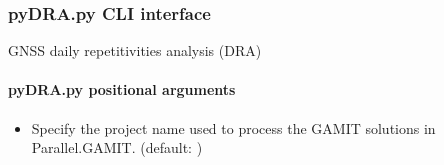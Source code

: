 \documentclass[letterpaper,10pt,english]{sphinxmanual}
\begin{document}
\subsubsection{pyDRA.py \sphinxhyphen{} CLI interface}
\label{\detokenize{stacker:pyDRA.py---CLI-interface}}
\sphinxAtStartPar
GNSS daily repetitivities analysis (DRA)

\begin{sphinxVerbatim}[commandchars=\\\{\}]
 \PYG{p}{[}\PYG{p}{]} \PYG{p}{[}  \PYG{p}{[} \PYG{p}{]}\PYG{p}{]} \PYG{p}{[}  \PYG{p}{[} \PYG{p}{]}\PYG{p}{]} \PYG{p}{[}\PYG{p}{]} \PYG{p}{[}\PYG{p}{]} \PYG{p}{[}\PYG{p}{]}  
\end{sphinxVerbatim}


\paragraph{pyDRA.py positional arguments}
\label{\detokenize{stacker:pyDRA.py-positional-arguments}}\begin{itemize}
\item {} 
\sphinxAtStartPar
{\hyperref[\detokenize{stacker:pyDRA.py-_project-name_}]{}} \sphinxhyphen{} Specify the project name used to process the GAMIT solutions in Parallel.GAMIT. (default: )

\end{itemize}
\end{document}
